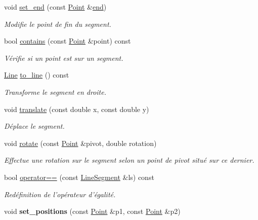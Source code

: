 \begin{DoxyCompactItemize}
void \hyperlink{classLineSegment_a8c001c5c898d912a9c6ecaba79a2cca3}{set\+\_\+end} (const \hyperlink{classPoint}{Point} \&\hyperlink{classLineSegment_a0852438c18570f230b6c6be1571b9460}{end})
\begin{DoxyCompactList}\small\item\em Modifie le point de fin du segment. \end{DoxyCompactList}\item 
bool \hyperlink{classLineSegment_a372c33eaea8eabc2e0a3e4f909f986dd}{contains} (const \hyperlink{classPoint}{Point} \&point) const 
\begin{DoxyCompactList}\small\item\em Vérifie si un point est sur un segment. \end{DoxyCompactList}\item 
\hyperlink{classLine}{Line} \hyperlink{classLineSegment_a0ca1dd12099a8629a67d5398f02e2529}{to\+\_\+line} () const 
\begin{DoxyCompactList}\small\item\em Transforme le segment en droite. \end{DoxyCompactList}\item 
void \hyperlink{classLineSegment_aedbd77b1d455613ea243fccfcdcf05fe}{translate} (const double x, const double y)
\begin{DoxyCompactList}\small\item\em Déplace le segment. \end{DoxyCompactList}\item 
void \hyperlink{classLineSegment_adf66b05ee5a1b034d8172848f9425943}{rotate} (const \hyperlink{classPoint}{Point} \&pivot, double rotation)
\begin{DoxyCompactList}\small\item\em Effectue une rotation sur le segment selon un point de pivot situé sur ce dernier. \end{DoxyCompactList}\item 
bool \hyperlink{classLineSegment_a74ef8c6e8a6c3c32250ae56cb76b23fe}{operator==} (const \hyperlink{classLineSegment}{Line\+Segment} \&ls) const 
\begin{DoxyCompactList}\small\item\em Redéfinition de l'opérateur d'égalité. \end{DoxyCompactList}\item 
\hypertarget{classLineSegment_a8c10acc2f581a9c118069446bc37a56e}{void {\bfseries set\+\_\+positions} (const \hyperlink{classPoint}{Point} \&p1, const \hyperlink{classPoint}{Point} \&p2)}\label{classLineSegment_a8c10acc2f581a9c118069446bc37a56e}

\end{DoxyCompactItemize}


